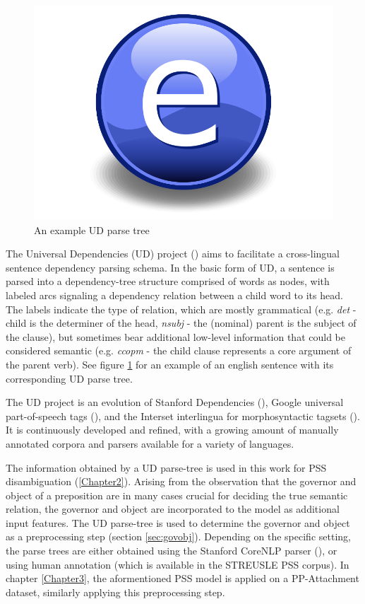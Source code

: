 \begin{figure}
    \centering
    \includegraphics{Figures/Electron.pdf}
    \caption{An example UD parse tree}
    \label{fig:udparsetree}
\end{figure}

The Universal Dependencies (UD) project (\cite{nivre-16}) aims to facilitate a cross-lingual sentence dependency parsing schema. In the basic form of UD, a sentence is parsed into a dependency-tree structure comprised of words as nodes, with labeled arcs signaling a dependency relation between a child word to its head. The labels indicate the type of relation, which are mostly grammatical (e.g. \emph{det} - child is the determiner of the head, \emph{nsubj} - the (nominal) parent is the subject of the clause), but sometimes bear additional low-level information that could be considered semantic (e.g. \emph{ccopm} - the child clause represents a core argument of the parent verb). See figure \ref{fig:udparsetree} for an example of an english sentence with its corresponding UD parse tree.

The UD project is an evolution of Stanford Dependencies (\cite{de-marneffe-etal-14-universal}), Google universal part-of-speech tags (\cite{37072}), and the Interset interlingua for morphosyntactic tagsets (\cite{Zeman08ReusableTC}). It is continuously developed and refined, with a growing amount of manually annotated corpora and parsers available for a variety of languages. 

The information obtained by a UD parse-tree is used in this work for PSS disambiguation (\ref{Chapter2}). Arising from the observation that the governor and object of a preposition are in many cases crucial for deciding the true semantic relation, the governor and object are incorporated to the model as additional input features. The UD parse-tree is used to determine the governor and object as a preprocessing step (section \ref{sec:govobj}). Depending on the specific setting, the parse trees are either obtained using the Stanford CoreNLP parser (\cite{manning14stanford}), or using human annotation (which is available in the STREUSLE PSS corpus). In chapter \ref{Chapter3}, the aformentioned PSS model is applied on a PP-Attachment dataset, similarly applying this preprocessing step.

